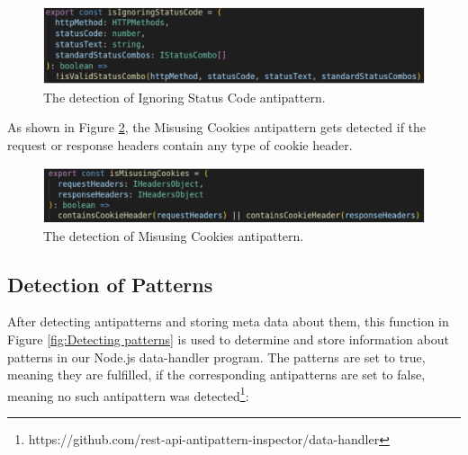 \documentclass[a4paper,12pt]{article}
\begin{document}
\begin{figure}[h!]
    \centering
    \includegraphics[keepaspectratio,scale=0.8]{Template_report_LaTeX_EN/img/ignoringStatusCode.png}
    \caption{The detection of Ignoring Status Code antipattern.}
    \label{fig:Ignoring Status Code}
\end{figure}

As shown in Figure \ref{fig:Misusing Cookies}, the Misusing Cookies antipattern gets detected if the request or response headers contain any type of cookie header.

\begin{figure}[h!]
    \centering
    \includegraphics[keepaspectratio,scale=0.8]{Template_report_LaTeX_EN/img/misusingCookies.png}
    \caption{The detection of Misusing Cookies antipattern.}
    \label{fig:Misusing Cookies}
\end{figure}

\subsection{Detection of Patterns}

After detecting antipatterns and storing meta data about them, this function in Figure \ref{fig:Detecting patterns} is used to determine and store information about patterns in our Node.js data-handler program. The patterns are set to true, meaning they are fulfilled, if the corresponding antipatterns are set to false, meaning no such antipattern was detected\footnote{https://github.com/rest-api-antipattern-inspector/data-handler}:
\end{document}
